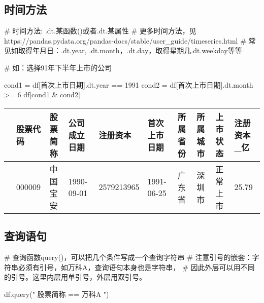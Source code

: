 \documentclass[
  letterpaper,
  DIV=11,
  numbers=noendperiod]{scrreprt}
\newenvironment{Shaded}{\begin{snugshade}}{\end{snugshade}}
\newcommand{\CommentTok}[1]{\textcolor[rgb]{0.37,0.37,0.37}{#1}}
\newcommand{\DecValTok}[1]{\textcolor[rgb]{0.68,0.00,0.00}{#1}}
\newcommand{\NormalTok}[1]{\textcolor[rgb]{0.00,0.23,0.31}{#1}}
\newcommand{\OperatorTok}[1]{\textcolor[rgb]{0.37,0.37,0.37}{#1}}
\newcommand{\StringTok}[1]{\textcolor[rgb]{0.13,0.47,0.30}{#1}}
\begin{document}
\hypertarget{ux65f6ux95f4ux65b9ux6cd5}{%
\subsection{时间方法}\label{ux65f6ux95f4ux65b9ux6cd5}}

\begin{Shaded}
\begin{Highlighting}[]
\CommentTok{\# 时间方法: \textquotesingle{}.dt.某函数()\textquotesingle{}或者\textquotesingle{}.dt.某属性\textquotesingle{}}
\CommentTok{\# 更多时间方法，见https://pandas.pydata.org/pandas{-}docs/stable/user\_guide/timeseries.html}
\CommentTok{\# 常见如取得年月日：.dt.year, .dt.month，.dt.day，取得星期几.dt.weekday等等}

\CommentTok{\# 如：选择91年下半年上市的公司}

\NormalTok{cond1 }\OperatorTok{=}\NormalTok{ df[}\StringTok{\textquotesingle{}首次上市日期\textquotesingle{}}\NormalTok{].dt.year }\OperatorTok{==} \DecValTok{1991}
\NormalTok{cond2 }\OperatorTok{=}\NormalTok{ df[}\StringTok{\textquotesingle{}首次上市日期\textquotesingle{}}\NormalTok{].dt.month }\OperatorTok{\textgreater{}=} \DecValTok{6}
\NormalTok{df[cond1 }\OperatorTok{\&}\NormalTok{ cond2]}
\end{Highlighting}
\end{Shaded}

\begin{longtable}[]{@{}llllllllll@{}}
\toprule\noalign{}
& 股票代码 & 股票简称 & 公司成立日期 & 注册资本 & 首次上市日期 &
所属省份 & 所属城市 & 上市状态 & 注册资本\_亿 \\
\midrule\noalign{}
\endhead
\bottomrule\noalign{}
\endlastfoot
7 & 000009 & 中国宝安 & 1990-09-01 & 2579213965 & 1991-06-25 & 广东省 &
深圳市 & 正常上市 & 25.79 \\
\end{longtable}

\hypertarget{ux67e5ux8be2ux8bedux53e5}{%
\subsection{查询语句}\label{ux67e5ux8be2ux8bedux53e5}}

\begin{Shaded}
\begin{Highlighting}[]
\CommentTok{\# 查询函数query()，可以把几个条件写成一个查询字符串}
\CommentTok{\# 注意引号的嵌套：字符串必须有引号，如\textquotesingle{}万科A\textquotesingle{}，查询语句本身也是字符串，}
\CommentTok{\# 因此外层可以用不同的引号。这里内层用单引号，外层用双引号。}

\NormalTok{df.query(}\StringTok{" 股票简称 == \textquotesingle{}万科A\textquotesingle{} "}\NormalTok{)}

\end{Highlighting}
\end{Shaded}
\end{document}

